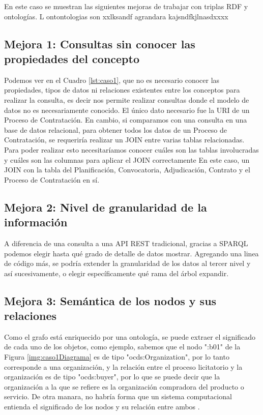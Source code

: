 En este caso se muestran las siguientes mejoras de trabajar con triplas RDF y ontologías. L ontontologias son xxlksandf agrandara kajsndfkjlnasdxxxx

\subsection{Mejora 1: Consultas sin conocer las propiedades del concepto}

Podemos ver en el Cuadro \ref{lst:caso1}, que no es necesario conocer las propiedades, tipos de datos ni relaciones existentes entre los conceptos para realizar la consulta, es decir nos permite realizar consultas donde el modelo de datos no es necesariamente conocido. El único dato necesario fue la URI de un Proceso de Contratación. En cambio, si comparamos con una consulta en una base de datos relacional, para obtener todos los datos de un Proceso de Contratación, se requeriría realizar un JOIN entre varias tablas relacionadas.  Para poder realizar esto necesitaríamos conocer cuáles son las tablas involucradas y cuáles son las columnas para aplicar el JOIN correctamente En este caso, un JOIN con la tabla del Planificación, Convocatoria, Adjudicación, Contrato  y el Proceso de  Contratación en sí.

\subsection{Mejora 2: Nivel de granularidad de la información}

A diferencia de una consulta a una API REST tradicional, gracias a SPARQL podemos elegir hasta qué grado de detalle de datos mostrar. Agregando una linea de código más, se podría extender la granularidad de los datos al tercer nivel y así sucesivamente, o elegir específicamente qué rama del árbol expandir.

\subsection{Mejora 3: Semántica de los nodos y sus relaciones}

Como el grafo está enriquecido por una ontología, se puede extraer el significado de cada uno de los objetos, como ejemplo, sabemos que el nodo ":b01" de la Figura \ref{img:caso1Diagrama} es de tipo "ocds:Organization", por lo tanto corresponde a una organización, y la relación entre el proceso licitatorio y la organización es de tipo "ocds:buyer", por lo que se puede decir que la organización a la que se refiere es la organización compradora del producto o servicio. De otra manara, no habría forma que un sistema computacional entienda el significado de los nodos y su relación entre ambos .
    

